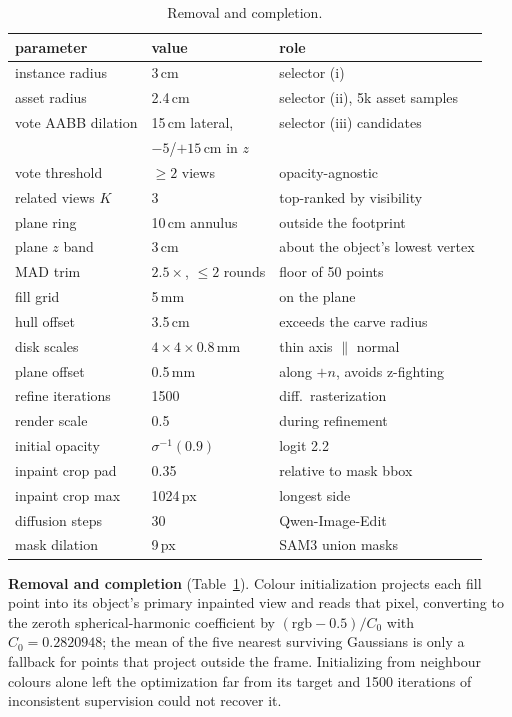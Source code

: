 \begin{table}[htbp]
\caption{Removal and completion.}
\label{tab:s-removal}
\centering\footnotesize\setlength{\tabcolsep}{4pt}
\begin{tabular}{@{}p{26mm}p{20mm}p{28mm}@{}}
\toprule
parameter & value & role \\
\midrule
instance radius & 3\,cm & selector (i) \\
asset radius & 2.4\,cm & selector (ii), 5k asset samples \\
vote AABB dilation & 15\,cm lateral, & selector (iii) candidates \\
 & $-5$/$+15$\,cm in $z$ & \\
vote threshold & $\geq2$ views & opacity-agnostic \\
related views $K$ & 3 & top-ranked by visibility \\
plane ring & 10\,cm annulus & outside the footprint \\
plane $z$ band & 3\,cm & about the object's lowest vertex \\
MAD trim & $2.5\times$, $\leq2$ rounds & floor of 50 points \\
fill grid & 5\,mm & on the plane \\
hull offset & 3.5\,cm & exceeds the carve radius \\
disk scales & $4{\times}4{\times}0.8$\,mm & thin axis $\parallel$ normal \\
plane offset & 0.5\,mm & along $+n$, avoids z-fighting \\
refine iterations & 1500 & diff.\ rasterization \\
render scale & 0.5 & during refinement \\
initial opacity & $\sigma^{-1}(0.9)$ & logit 2.2 \\
inpaint crop pad & 0.35 & relative to mask bbox \\
inpaint crop max & 1024\,px & longest side \\
diffusion steps & 30 & Qwen-Image-Edit \\
mask dilation & 9\,px & SAM3 union masks \\
\bottomrule
\end{tabular}
\end{table}

\textbf{Removal and completion} (Table~\ref{tab:s-removal}). Colour
initialization projects each fill point into its object's primary
inpainted view and reads that pixel, converting to the zeroth
spherical-harmonic coefficient by $(\text{rgb}-0.5)/C_0$ with
$C_0 = 0.2820948$; the mean of the five nearest surviving Gaussians is
only a fallback for points that project outside the frame. Initializing
from neighbour colours alone left the optimization far from its target and
1500 iterations of inconsistent supervision could not recover it.

